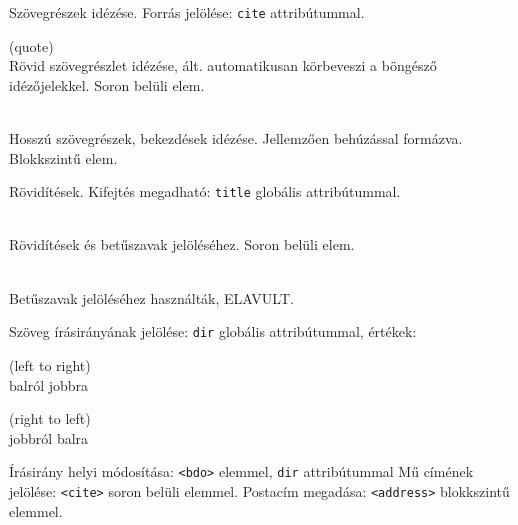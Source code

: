 \documentclass[usenames,dvipsnames,aspectratio=169]{beamer}
\newcommand{\kiemel}[1]{{\color{kiemelesszin}#1}}
\begin{document}
\begin{frame}
  Szövegrészek idézése. Forrás jelölése: \texttt{cite} attribútummal.
  \begin{description}[m]
    \item[\texttt{<q>}] (quote) \hfill \\ Rövid szövegrészlet idézése, ált. automatikusan körbeveszi a böngésző idézőjelekkel. Soron belüli elem.
    \item[\texttt{<blockquote>}] \hfill \\ Hosszú szövegrészek, bekezdések idézése. Jellemzően behúzással formázva. Blokkszintű elem.
  \end{description}
  \vfill
  Rövidítések. Kifejtés megadható: \texttt{title} globális attribútummal.
  \begin{description}[m]
    \item[\texttt{<abbr>}] \hfill \\ Rövidítések és betűszavak jelöléséhez. Soron belüli elem.
    \item[\texttt{<acronym>}] \hfill \\ Betűszavak jelöléséhez használták, \kiemel{ELAVULT}.
  \end{description}
\end{frame}

\begin{frame}
  Szöveg írásirányának jelölése: \texttt{dir} globális attribútummal, értékek:
  \begin{description}[m]
    \item[\texttt{ltr}] (left to right) \hfill \\ balról jobbra
    \item[\texttt{rtl}] (right to left) \hfill \\ jobbról balra
  \end{description}
  \vfill
  Írásirány helyi módosítása: \texttt{<bdo>} elemmel, \texttt{dir} attribútummal
  \vfill
  Mű címének jelölése: \texttt{<cite>} soron belüli elemmel.
  \vfill
  Postacím megadása: \texttt{<address>} blokkszintű elemmel.
\end{frame}
\end{document}
